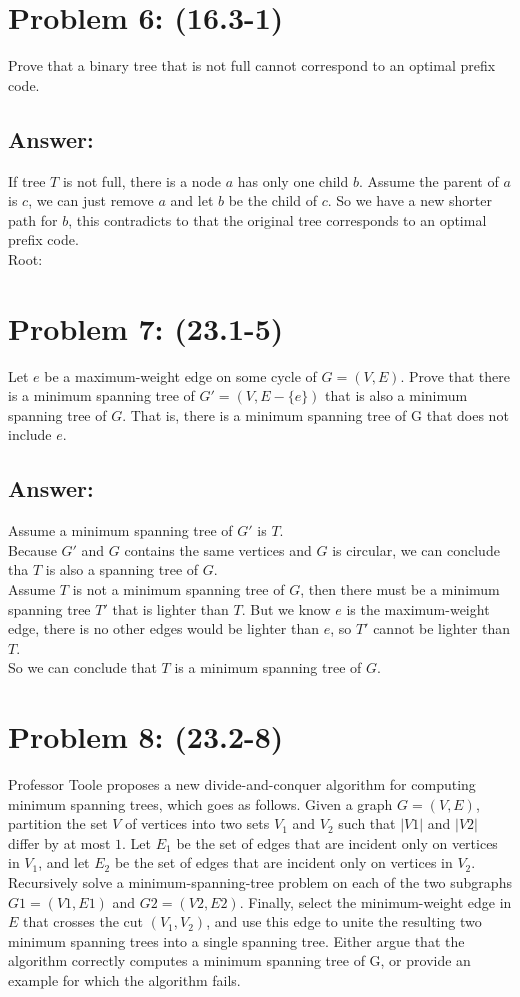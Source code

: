 \documentclass[letter]{article}
\begin{document}
\section*{Problem 6: (16.3-1)} Prove that a binary tree that is not full cannot correspond to an optimal prefix code.
\subsection*{Answer:}
If tree $T$ is not full, there is a node $a$ has only one child $b$. Assume the parent of $a$ is $c$, we can just remove $a$ and let $b$ be the child of $c$. So we have a new shorter path for $b$, this contradicts to that the original tree corresponds to an optimal prefix code.\\
Root:

\section*{Problem 7: (23.1-5)} Let $e$ be a maximum-weight edge on some cycle of $G = (V, E)$. Prove that there is a minimum spanning tree of $G' = (V, E -\{e\})$ that is also a minimum spanning tree of $G$. That is, there is a minimum spanning tree of G that does not include $e$.
\subsection*{Answer:}
Assume a minimum spanning tree of $G'$ is $T$.\\
Because $G'$ and $G$ contains the same vertices and $G$ is circular, we can conclude tha $T$ is also a spanning tree of $G$.\\
Assume $T$ is not a minimum spanning tree of $G$, then there must be a minimum spanning tree $T'$ that is lighter than $T$. But we know $e$ is the maximum-weight edge, there is no other edges would be lighter than $e$, so $T'$ cannot be lighter than $T$.\\
So we can conclude that $T$ is a  minimum spanning tree of $G$.

\section*{Problem 8: (23.2-8)} Professor Toole proposes a new divide-and-conquer algorithm for computing minimum spanning trees, which goes as follows. Given a graph $G = (V, E)$, partition the set $V$ of vertices into two sets $V_1$ and $V_2$ such that $|V1|$ and $|V2|$ differ by at most $1$. Let $E_1$ be the set of edges that are incident only on vertices in $V_1$, and let $E_2$ be the set of edges that are incident only on vertices in $V_2$. Recursively solve a minimum-spanning-tree problem on each of the two subgraphs $G1 = (V1, E1)$ and $G2 = (V2, E2)$. Finally, select the minimum-weight edge in $E$ that crosses the cut $(V_1, V_2)$, and use this edge to unite the resulting two minimum spanning trees into a single spanning tree. Either argue that the algorithm correctly computes a minimum spanning tree of G, or provide an example for which the algorithm fails.
\end{document}
